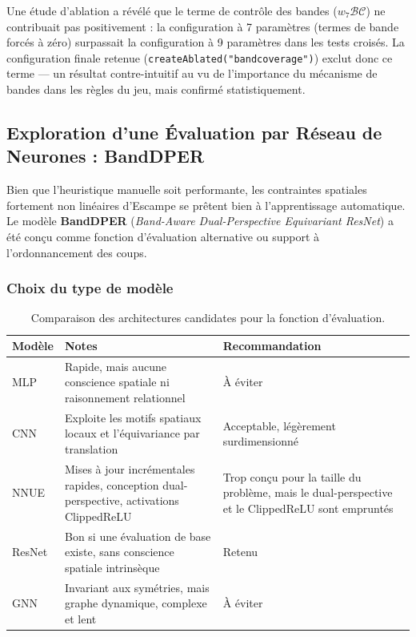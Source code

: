 \documentclass[12pt,a4paper]{article}
\begin{document}
Une étude d'ablation a révélé que le terme de contrôle des bandes ($w_7 \mathcal{BC}$) ne contribuait pas positivement : la configuration à 7 paramètres (termes de bande forcés à zéro) surpassait la configuration à 9 paramètres dans les tests croisés. La configuration finale retenue (\texttt{createAblated("bandcoverage")}) exclut donc ce terme — un résultat contre-intuitif au vu de l'importance du mécanisme de bandes dans les règles du jeu, mais confirmé statistiquement.

\subsection{Exploration d'une Évaluation par Réseau de Neurones : BandDPER}

Bien que l'heuristique manuelle soit performante, les contraintes spatiales fortement non linéaires d'Escampe se prêtent bien à l'apprentissage automatique. Le modèle \textbf{BandDPER} (\textit{Band-Aware Dual-Perspective Equivariant ResNet}) a été conçu comme fonction d'évaluation alternative ou support à l'ordonnancement des coups.

\subsubsection*{Choix du type de modèle}

\begin{table}[H]
\centering
\begin{tabular}{p{1.8cm} p{6.5cm} p{4.5cm}}
\toprule
Modèle & Notes & Recommandation \\
\midrule
MLP & Rapide, mais aucune conscience spatiale ni raisonnement relationnel & À éviter \\
CNN & Exploite les motifs spatiaux locaux et l'équivariance par translation & Acceptable, légèrement surdimensionné \\
NNUE & Mises à jour incrémentales rapides, conception dual-perspective, activations ClippedReLU & Trop conçu pour la taille du problème, mais le dual-perspective et le ClippedReLU sont empruntés \\
ResNet & Bon si une évaluation de base existe, sans conscience spatiale intrinsèque & Retenu \\
GNN & Invariant aux symétries, mais graphe dynamique, complexe et lent & À éviter \\
\bottomrule
\end{tabular}
\caption{Comparaison des architectures candidates pour la fonction d'évaluation.}
\label{tab:existing-models}
\end{table}
\end{document}
